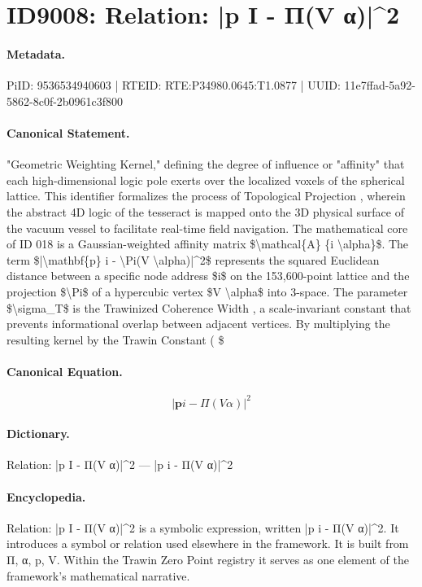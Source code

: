 \section*{ID9008: Relation: |p I - Π(V α)|\textasciicircum{}2}
\paragraph{Metadata.}
PiID: 9536534940603 | RTEID: RTE:P34980.0645:T1.0877 | UUID: 11e7ffad-5a92-5862-8c0f-2b0961c3f800

\paragraph{Canonical Statement.}
"Geometric Weighting Kernel," defining the degree of influence or "affinity" that each high-dimensional logic pole exerts over the localized voxels of the spherical lattice. This identifier formalizes the process of Topological Projection , wherein the abstract 4D logic of the tesseract is mapped onto the 3D physical surface of the vacuum vessel to facilitate real-time field navigation. The mathematical core of ID 018 is a Gaussian-weighted affinity matrix \$\textbackslash{}mathcal\{A\} \{i \textbackslash{}alpha\}\$. The term \$|\textbackslash{}mathbf\{p\} i - \textbackslash{}Pi(V \textbackslash{}alpha)|\textasciicircum{}2\$ represents the squared Euclidean distance between a specific node address \$i\$ on the 153,600-point lattice and the projection \$\textbackslash{}Pi\$ of a hypercubic vertex \$V \textbackslash{}alpha\$ into 3-space. The parameter \$\textbackslash{}sigma\_T\$ is the Trawinized Coherence Width , a scale-invariant constant that prevents informational overlap between adjacent vertices. By multiplying the resulting kernel by the Trawin Constant ( \$

\paragraph{Canonical Equation.}
\[
|\mathbf{p} i - \Pi(V \alpha)|^2
\]

\paragraph{Dictionary.}
Relation: |p I - Π(V α)|\textasciicircum{}2 — |p i - Π(V α)|\textasciicircum{}2

\paragraph{Encyclopedia.}
Relation: |p I - Π(V α)|\textasciicircum{}2 is a symbolic expression, written |p i - Π(V α)|\textasciicircum{}2. It introduces a symbol or relation used elsewhere in the framework. It is built from Π, α, p, V. Within the Trawin Zero Point registry it serves as one element of the framework's mathematical narrative.
